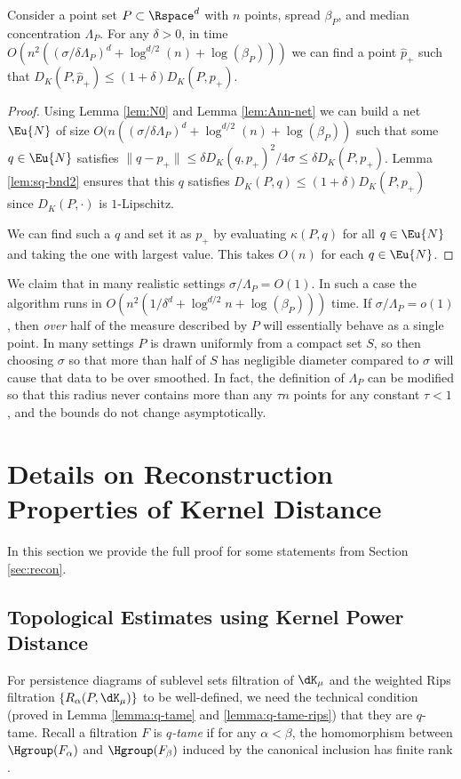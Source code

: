 \documentclass[11pt]{myclass}
\begin{document}
\begin{theorem}
\label{thm:phat+}
Consider a point set $P \subset \Rspace^d$ with $n$ points, spread $\beta_P$, and median concentration $\Lambda_P$.  
For any $\delta > 0$, in time $O(n^2 ((\sigma/\delta \Lambda_P)^d + \log^{d/2}(n)+ \log(\beta_P)))$ we can find a point $\hat p_+$ such that $D_K(P,\hat p_+) \leq (1 + \delta) D_K(P,p_+)$.  
\end{theorem}
\begin{proof}
Using Lemma \ref{lem:N0} and Lemma \ref{lem:Ann-net} we can build a net $\Eu{N}$ of size $O(n((\sigma/\delta \Lambda_P)^d + \log^{d/2}(n) + \log(\beta_P))$ such that some $q \in \Eu{N}$ satisfies $\|q-p_+\| \leq \delta D_K(q,p_+)^2 /4 \sigma \leq \delta D_K(P,p_+)$.  Lemma \ref{lem:sq-bnd2} ensures that this $q$ satisfies $D_K(P,q) \leq (1 + \delta) D_K(P,p_+)$ since $D_K(P,\cdot)$ is $1$-Lipschitz.  

We can find such a $q$ and set it as $p_+$ by evaluating $\kappa(P,q)$ for all $q \in \Eu{N}$ and taking the one with largest value.  This takes $O(n)$ for each $q \in \Eu{N}$. 
\end{proof}


We claim that in many realistic settings $\sigma/\Lambda_P = O(1)$.  In such a case the algorithm runs in $O(n^2 (1/\delta^d + \log^{d/2} n + \log(\beta_P)))$ time.  
If $\sigma/\Lambda_P = o(1)$, then \emph{over} half of the measure described by $P$ will essentially behave as a single point.  In many settings $P$ is drawn uniformly from a compact set $S$, so then choosing $\sigma$ so that more than half of $S$ has negligible diameter compared to $\sigma$ will cause that data to be over smoothed.  
In fact, the definition of $\Lambda_P$ can be modified so that this radius never contains more than any $\tau n$ points for any constant $\tau < 1$, and the bounds do not change asymptotically.  





\section{Details on Reconstruction Properties of Kernel Distance}
\label{app:recon}

In this section we provide the full proof for some statements from Section \ref{sec:recon}.  

\subsection{Topological Estimates using Kernel Power Distance}
\label{subsec:approximation}
For persistence diagrams of sublevel sets filtration of $\dK_{\mu}$ and the weighted Rips filtration $\{R_{\alpha}(P,\dK_\mu)\}$ to be well-defined, we need the technical condition (proved in Lemma \ref{lemma:q-tame} and \ref{lemma:q-tame-rips}) that they are $q$-tame. 
Recall a filtration $F$ is \emph{$q$-tame} if for any $\alpha < \beta$, the homomorphism between 
$\Hgroup(F_{\alpha})$ and $\Hgroup(F_{\beta})$ induced by the canonical inclusion has finite rank \cite{ChazalCohen-SteinerGlisse2009,ChazalSilvaGlisse2013}. 
\end{document}
